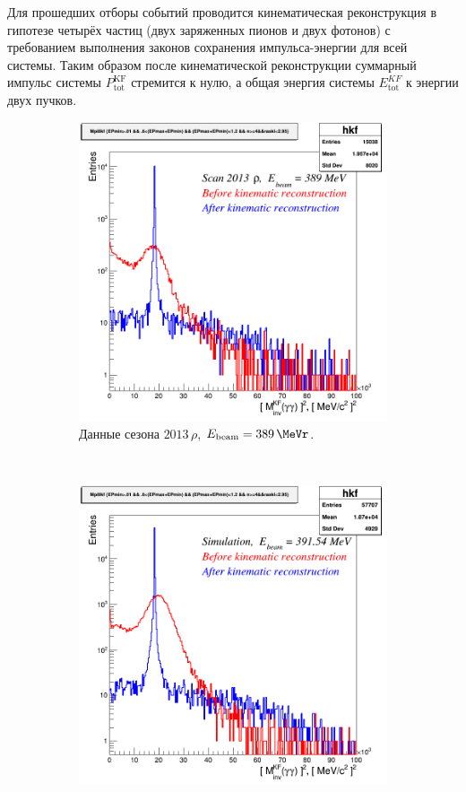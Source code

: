 Для прошедших отборы событий проводится кинематическая реконструкция в гипотезе четырёх частиц (двух заряженных пионов и двух фотонов) с требованием выполнения законов сохранения импульса-энергии для всей системы.
Таким образом после кинематической реконструкции суммарный импульс системы $P^{\text{KF}}_{\text{tot}}$ стремится к нулю,
а общая энергия системы $E^{KF}_{\text{tot}}$ к энергии двух пучков.
\begin{figure}[htbp]
    \centering
    \begin{subfigure}[t]{0.45\textwidth}
        \includegraphics[width=\textwidth]{img/diff_kf_mpi0_2013rho389.png}
        \caption{Данные сезона $2013 \, \rho$, $E_{\text{beam}} = \SI{389}{\MeVr}$.}
        \label{fig:3pi_diff_kf_mpi0_2013rho389}
    \end{subfigure}
    ~
    \begin{subfigure}[t]{0.45\textwidth}
        \includegraphics[width=\textwidth]{img/diff_kf_mpi0_sim391_54.png}

\end{subfigure}
\end{figure}
